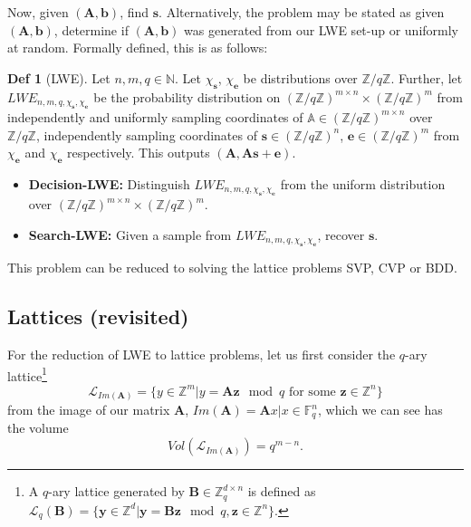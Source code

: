 \documentclass[a4paper, 10pt]{article}
\theoremstyle{definition}
\newtheorem{definition}{Def}[section]
\begin{document}
Now, given $(\mathbf{A},\mathbf{b})$, find $\mathbf{s}$. Alternatively, the problem may be stated as given $(\mathbf{A},\mathbf{b})$, determine if $(\mathbf{A},\mathbf{b})$ was generated from our \ac{LWE} set-up or uniformly at random. Formally defined, this is as follows:\par

\begin{definition}[\ac{LWE}]
    Let $n,m,q \in \mathbb{N}$. Let $\chi _\mathbf{s}$, $\chi _\mathbf{e}$ be distributions over $\mathbb{Z}/q\mathbb{Z}$. Further, let $LWE_{n,m,q,\chi _\mathbf{s}, \chi _\mathbf{e}}$ be the probability distribution on $(\mathbb{Z}/q\mathbb{Z})^{m \times n} \times (\mathbb{Z}/q\mathbb{Z})^m$ from independently and uniformly sampling coordinates of $\mathbb{A} \in(\mathbb{Z}/q\mathbb{Z})^{m \times n}$ over $\mathbb{Z}/q\mathbb{Z}$, independently sampling coordinates of $\mathbf{s}\in (\mathbb{Z}/q\mathbb{Z})^n$, $\mathbf{e}\in (\mathbb{Z}/q\mathbb{Z})^m$ from $\chi _\mathbf{e}$ and $\chi _\mathbf{e}$ respectively. This outputs $(\mathbf{A},\mathbf{As} + \mathbf{e})$.

    \begin{itemize}
        \item \textbf{Decision-LWE:} Distinguish $LWE_{n,m,q,\chi _\mathbf{s}, \chi _\mathbf{e}}$ from the uniform distribution over $(\mathbb{Z}/q\mathbb{Z})^{m \times n} \times (\mathbb{Z}/q\mathbb{Z})^m$.
        \item \textbf{Search-\ac{LWE}:} Given a sample from $LWE_{n,m,q,\chi _\mathbf{s}, \chi _\mathbf{e}}$, recover $\mathbf{s}$.
    \end{itemize}
\end{definition}

This problem can be reduced to solving the lattice problems \ac{SVP}, \ac{CVP} or \ac{BDD}.\par  

\subsection{Lattices (revisited)}

For the reduction of \ac{LWE} to lattice problems, let us first consider the  $q$-ary lattice\footnote{A $q$-ary lattice generated by $\mathbf{B}\in\mathbb{Z}^{d\times n}_q$ is defined as $\mathcal{L}_q(\mathbf{B})=\{\mathbf{y}\in \mathbb{Z}^d|\mathbf{y}=\mathbf{Bz}\mod{q}, \mathbf{z}\in\mathbb{Z}^n \}$.}
\[\mathcal{L}_{Im(\mathbf{A})}=\{y \in \mathbb{Z}^m | y=\mathbf{Az}\mod{q} \mbox{ for some } \mathbf{z} \in \mathbb{Z}^n \}\]
from the image of our matrix $\mathbf{A}$, $Im(\mathbf{A})={\mathbf{A}x|x\in \mathbb{F}_q^n}$, which we can see has the volume
\[Vol(\mathcal{L}_{Im(\mathbf{A})})=q^{m-n}\text{.}\]
\end{document}
